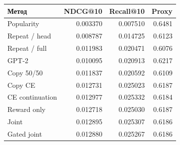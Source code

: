 \begin{tabular}{lrrr}\toprule
Метод & NDCG@10 & Recall@10 & Proxy\\\midrule
Popularity & 0.003370 & 0.007510 & 0.6481 \\
Repeat / head & 0.008787 & 0.014725 & 0.6123 \\
Repeat / full & 0.011983 & 0.020471 & 0.6076 \\
GPT-2 & 0.010095 & 0.020913 & 0.6217 \\
Copy 50/50 & 0.011837 & 0.020592 & 0.6109 \\
Copy CE & 0.012731 & 0.025023 & 0.6187 \\
CE continuation & 0.012977 & 0.025332 & 0.6184 \\
Reward only & 0.012718 & 0.025030 & 0.6187 \\
Joint & 0.012895 & 0.025307 & 0.6186 \\
Gated joint & 0.012880 & 0.025267 & 0.6186 \\
\bottomrule\end{tabular}
